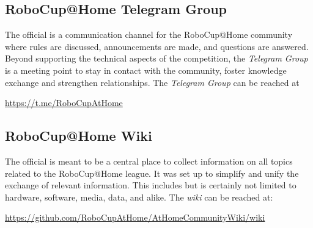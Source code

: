 \subsection{RoboCup@Home Telegram Group}
The official  is a communication channel for the RoboCup@Home community where rules are discussed, announcements are made, and questions are answered.
Beyond supporting the technical aspects of the competition, the \textit{Telegram Group} is a meeting point to stay in contact with the community, foster knowledge exchange and strengthen relationships.
The \textit{Telegram Group} can be reached at
\begin{center}
{\small\url{https://t.me/RoboCupAtHome}}
\end{center}

\subsection{RoboCup@Home Wiki}
\label{sec:at_home_wiki}
The official  is meant to be a central place to collect information on all topics related to the RoboCup@Home league. It was set up to simplify and unify the exchange of relevant information.
This includes but is certainly not limited to hardware, software, media, data, and alike.
The \textit{wiki} can be reached at:
\begin{center}
{\small\url{https://github.com/RoboCupAtHome/AtHomeCommunityWiki/wiki}}
\end{center}

